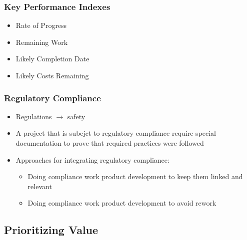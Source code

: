 \documentclass[letterpaper,10pt,english]{jupyterBook}
\begin{document}
\subsubsection{Key Performance Indexes}
\label{\detokenize{APM/agile:key-performance-indexes}}\begin{itemize}
\item {} 
\sphinxAtStartPar
Rate of Progress

\item {} 
\sphinxAtStartPar
Remaining Work

\item {} 
\sphinxAtStartPar
Likely Completion Date

\item {} 
\sphinxAtStartPar
Likely Costs Remaining

\end{itemize}


\subsubsection{Regulatory Compliance}
\label{\detokenize{APM/agile:regulatory-compliance}}\begin{itemize}
\item {} 
\sphinxAtStartPar
Regulations \(\rightarrow \) safety

\item {} 
\sphinxAtStartPar
A project that is subejct to regulatory compliance require special documentation to prove that required practices were followed

\item {} 
\sphinxAtStartPar
Approaches for integrating regulatory compliance:
\begin{itemize}
\item {} 
\sphinxAtStartPar
Doing compliance work  product development to keep them linked and relevant

\item {} 
\sphinxAtStartPar
Doing compliance work  product development to avoid rework

\end{itemize}

\end{itemize}


\subsection{Prioritizing Value}
\label{\detokenize{APM/agile:prioritizing-value}}
\end{document}
